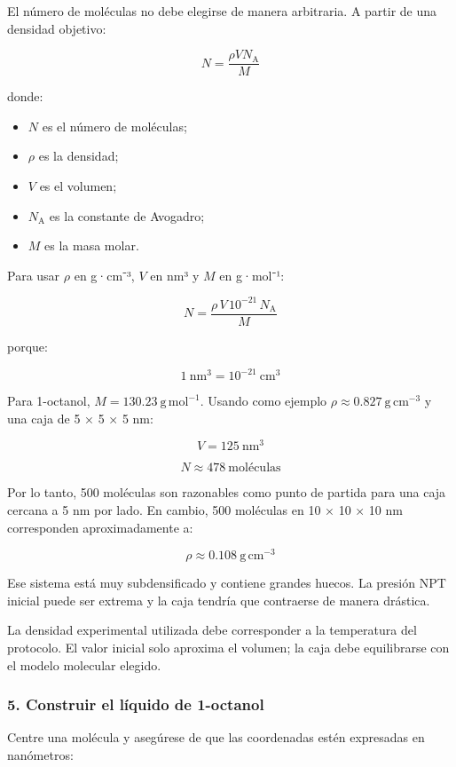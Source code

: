 \documentclass[
  spanish,
  11pt,
  a4paper]{article}
\providecommand{\tightlist}{%
  \setlength{\itemsep}{0pt}\setlength{\parskip}{0pt}}
\begin{document}
El número de moléculas no debe elegirse de manera arbitraria. A partir
de una densidad objetivo:

\[
N = \frac{\rho V N_\mathrm{A}}{M}
\]

donde:

\begin{itemize}
\tightlist
\item
  \(N\) es el número de moléculas;
\item
  \(\rho\) es la densidad;
\item
  \(V\) es el volumen;
\item
  \(N_\mathrm{A}\) es la constante de Avogadro;
\item
  \(M\) es la masa molar.
\end{itemize}

Para usar \(\rho\) en g·cm⁻³, \(V\) en nm³ y \(M\) en g·mol⁻¹:

\[
N = \frac{\rho\,V\,10^{-21}\,N_\mathrm{A}}{M}
\]

porque:

\[
1\ \mathrm{nm^3}=10^{-21}\ \mathrm{cm^3}
\]

Para 1-octanol, \(M = 130.23\ \mathrm{g\,mol^{-1}}\). Usando como
ejemplo \(\rho \approx 0.827\ \mathrm{g\,cm^{-3}}\) y una caja de 5 × 5
× 5 nm:

\[
V=125\ \mathrm{nm^3}
\]

\[
N \approx 478\ \text{moléculas}
\]

Por lo tanto, 500 moléculas son razonables como punto de partida para
una caja cercana a 5 nm por lado. En cambio, 500 moléculas en 10 × 10 ×
10 nm corresponden aproximadamente a:

\[
\rho \approx 0.108\ \mathrm{g\,cm^{-3}}
\]

Ese sistema está muy subdensificado y contiene grandes huecos. La
presión NPT inicial puede ser extrema y la caja tendría que contraerse
de manera drástica.

La densidad experimental utilizada debe corresponder a la temperatura
del protocolo. El valor inicial solo aproxima el volumen; la caja debe
equilibrarse con el modelo molecular elegido.

\subsubsection{5. Construir el líquido de
1-octanol}\label{construir-el-luxedquido-de-1-octanol}

Centre una molécula y asegúrese de que las coordenadas estén expresadas
en nanómetros:
\end{document}
